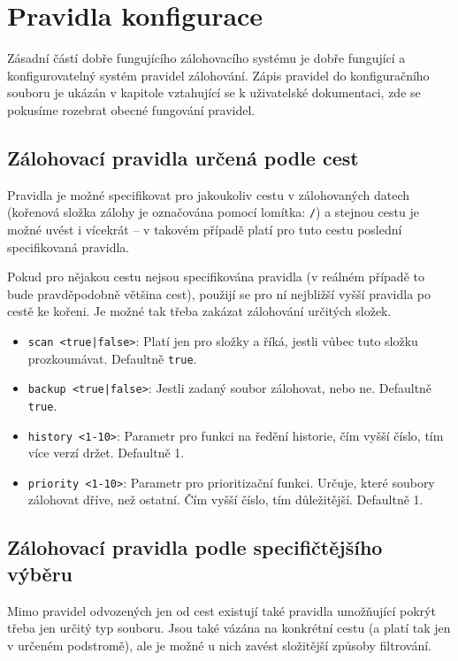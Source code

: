 \section{Pravidla konfigurace}

Zásadní částí dobře fungujícího zálohovacího systému je dobře fungující
a konfigurovatelný systém pravidel zálohování. Zápis pravidel do konfiguračního
souboru je ukázán v kapitole vztahující se k uživatelské dokumentaci, zde se
pokusíme rozebrat obecné fungování pravidel.

\subsection{Zálohovací pravidla určená podle cest}

Pravidla je možné specifikovat pro jakoukoliv cestu v zálohovaných datech
(kořenová složka zálohy je označována pomocí lomítka: \texttt{/}) a stejnou
cestu je možné uvést i vícekrát -- v takovém případě platí pro tuto cestu
poslední specifikovaná pravidla.

Pokud pro nějakou cestu nejsou specifikována pravidla (v reálném případě to bude
pravděpodobně většina cest), použijí se pro ní nejbližší vyšší pravidla po cestě
ke kořeni. Je možné tak třeba zakázat zálohování určitých složek.

\medskip

\begin{itemize}
	\item {\tt scan <true|false>}: Platí jen pro složky a říká, jestli vůbec
	tuto složku prozkoumávat. Defaultně {\tt true}.
	\item {\tt backup <true|false>}: Jestli zadaný soubor zálohovat, nebo
	ne. Defaultně {\tt true}.
	\item {\tt history <1-10>}: Parametr pro funkci na ředění historie, čím
	vyšší číslo, tím více verzí držet. Defaultně 1.
	\item {\tt priority <1-10>}: Parametr pro prioritizační funkci. Určuje,
	které soubory zálohovat dříve, než ostatní. Čím vyšší číslo, tím
	důležitější. Defaultně 1.
\end{itemize}

\subsection{Zálohovací pravidla podle specifičtějšího výběru}

Mimo pravidel odvozených jen od cest existují také pravidla umožňující pokrýt
třeba jen určitý typ souboru. Jsou také vázána na konkrétní cestu (a platí tak
jen v určeném podstromě), ale je možné u nich zavést složitější způsoby
filtrování.


